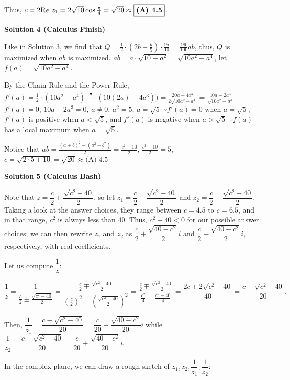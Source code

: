 \begin{enumerate}
 Thus, $c= 2 {\textrm Re} \ z_1 =2 \sqrt{10} \cos\frac{\pi}{4}=\sqrt{20} \approx \boxed{\textbf{(A) 4.5}}$.

 



\textbf{Solution 4 (Calculus Finish)}

Like in Solution 3, we find that $Q = \frac12\cdot\left(2b+\frac{b}{5}\right)\cdot\frac{9a}{10}= \frac{99}{100}ab$, thus, $Q$ is maximized when $ab$ is maximized. $ab = a \cdot \sqrt{10 - a^2} = \sqrt{10a^2 - a^4}$, let $f(a) =  \sqrt{10a^2 - a^4}$.

 By the Chain Rule and the Power Rule, $f'(a) = \frac12 \cdot (10a^2 - a^4)^{-\frac12} \cdot (10(2a)-4a^3)) = \frac{20a-4a^3}{ 2\sqrt{10a^2 - a^4} } = \frac{10a-2a^3}{ \sqrt{10a^2 - a^4} }$
$f'(a) = 0$, $10a-2a^3 = 0$, $a \neq 0$, $a^2 = 5$, $a = \sqrt{5}$
$\because f'(a) = 0$ when $a = \sqrt{5}$, $f'(a)$ is positive when $a < \sqrt{5}$, and $f'(a)$ is negative when $a > \sqrt{5}$
$\therefore f(a)$ has a local maximum when $a = \sqrt{5}$.

 Notice that $ab = \frac{ (a+b)^2 - (a^2+b^2) }{2} = \frac{c^2 - 10}{2}$, $\frac{c^2 - 10}{2} = 5$, $c = \sqrt{2 \cdot 5 + 10} = \sqrt{20} \approx \boxed{\text{(A) 4.5}}$




\textbf{Solution 5 (Calculus Bash)}

Note that $z=\dfrac c2\pm\dfrac{\sqrt{c^2-40}}2$, so let $z_1=\dfrac c2+\dfrac{\sqrt{c^2-40}}2$ and $z_2=\dfrac c2-\dfrac{\sqrt{c^2-40}}2$. Taking a look at the answer choices, they range between $c=4.5$ to $c=6.5$, and in that range, $c^2$ is always less than $40$. Thus, $c^2-40<0$ for our possible answer choices; we can then rewrite $z_1$ and $z_2$ as $\dfrac c2+\dfrac{\sqrt{40-c^2}}2i$ and $\dfrac c2-\dfrac{\sqrt{40-c^2}}2i$, respectively, with real coefficients. 

 Let us compute $\dfrac1z$: 

 
 \[\dfrac1z=\dfrac1{\frac c2\pm\frac{\sqrt{c^2-40}}2}=\dfrac{\frac c2\mp\frac{\sqrt{c^2-40}}2}{\left(\frac c2\right)^2-\left(\frac{\sqrt{c^2-40}}2\right)^2}=\dfrac{\frac c2\mp\frac{\sqrt{c^2-40}}2}{\frac{c^2}4-\frac{c^2-40}4}=\dfrac{2c\mp2\sqrt{c^2-40}}{40}=\dfrac{c\mp\sqrt{c^2-40}}{20}.\] 

 Then, $\dfrac1{z_1}=\dfrac{c-\sqrt{c^2-40}}{20}=\dfrac c{20}-\dfrac{\sqrt{40-c^2}}{20}i$ while $\dfrac1{z_2}=\dfrac{c+\sqrt{c^2-40}}{20}=\dfrac c{20}+\dfrac{\sqrt{40-c^2}}{20}i$. 

 In the complex plane, we can draw a rough sketch of $z_1,z_2,\dfrac1{z_1},\dfrac1{z_2}$: 


\end{enumerate}
